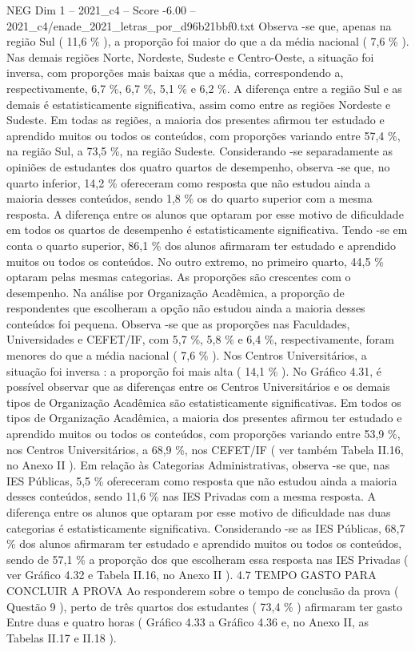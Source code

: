 \begin{textsample}{NEG Dim 1 – 2021\_c4 – Score -6.00 – 2021\_c4/enade\_2021\_letras\_por\_d96b21bbf0.txt}
Observa -se que, apenas na região Sul ( 11,6 \% ), a proporção foi maior do que a da média nacional ( 7,6 \% ).
Nas demais regiões Norte, Nordeste, Sudeste e Centro-Oeste, a situação foi inversa, com proporções mais baixas que a média, correspondendo a, respectivamente, 6,7 \%, 6,7 \%, 5,1 \% e 6,2 \%.
A diferença entre a região Sul e as demais é estatisticamente significativa, assim como entre as regiões Nordeste e Sudeste.
Em todas as regiões, a maioria dos presentes afirmou ter estudado e aprendido muitos ou todos os conteúdos, com proporções variando entre 57,4 \%, na região Sul, a 73,5 \%, na região Sudeste.
Considerando -se separadamente as opiniões de estudantes dos quatro quartos de desempenho, observa -se que, no quarto inferior, 14,2 \% ofereceram como resposta que não estudou ainda a maioria desses conteúdos, sendo 1,8 \% os do quarto superior com a mesma resposta.
A diferença entre os alunos que optaram por esse motivo de dificuldade em todos os quartos de desempenho é estatisticamente significativa.
Tendo -se em conta o quarto superior, 86,1 \% dos alunos afirmaram ter estudado e aprendido muitos ou todos os conteúdos.
No outro extremo, no primeiro quarto, 44,5 \% optaram pelas mesmas categorias.
As proporções são crescentes com o desempenho.
Na análise por Organização Acadêmica, a proporção de respondentes que escolheram a opção não estudou ainda a maioria desses conteúdos foi pequena.
Observa -se que as proporções nas Faculdades, Universidades e CEFET/IF, com 5,7 \%, 5,8 \% e 6,4 \%, respectivamente, foram menores do que a média nacional ( 7,6 \% ).
Nos Centros Universitários, a situação foi inversa : a proporção foi mais alta ( 14,1 \% ).
No Gráfico 4.31, é possível observar que as diferenças entre os Centros Universitários e os demais tipos de Organização Acadêmica são estatisticamente significativas.
Em todos os tipos de Organização Acadêmica, a maioria dos presentes afirmou ter estudado e aprendido muitos ou todos os conteúdos, com proporções variando entre 53,9 \%, nos Centros Universitários, a 68,9 \%, nos CEFET/IF ( ver também Tabela II.16, no Anexo II ).
Em relação às Categorias Administrativas, observa -se que, nas IES Públicas, 5,5 \% ofereceram como resposta que não estudou ainda a maioria desses conteúdos, sendo 11,6 \% nas IES Privadas com a mesma resposta.
A diferença entre os alunos que optaram por esse motivo de dificuldade nas duas categorias é estatisticamente significativa.
Considerando -se as IES Públicas, 68,7 \% dos alunos afirmaram ter estudado e aprendido muitos ou todos os conteúdos, sendo de 57,1 \% a proporção dos que escolheram essa resposta nas IES Privadas ( ver Gráfico 4.32 e Tabela II.16, no Anexo II ). 4.7 TEMPO GASTO PARA CONCLUIR A PROVA Ao responderem sobre o tempo de conclusão da prova ( Questão 9 ), perto de três quartos dos estudantes ( 73,4 \% ) afirmaram ter gasto Entre duas e quatro horas ( Gráfico 4.33 a Gráfico 4.36 e, no Anexo II, as Tabelas II.17 e II.18 ).

\end{textsample}
